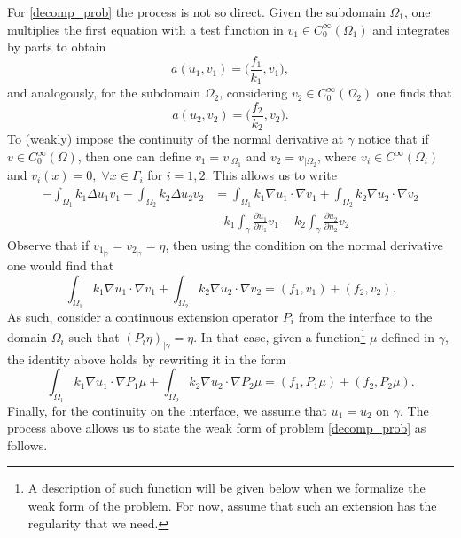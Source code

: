 For \eqref{decomp_prob} the process is not so direct. Given the subdomain \(\Omega_1\), one multiplies the first equation with a test function in \(v_1 \in C^\infty_0(\Omega_1)\) and integrates by parts to obtain
\[
a(u_1,v_1) = \Big(\frac{f_1}{k_1}, v_1\Big),
\]
and analogously, for the subdomain \(\Omega_2\), considering \(v_2 \in C^\infty_0(\Omega_2)\) one finds that
\[
a(u_2,v_2) = \Big(\frac{f_2}{k_2}, v_2\Big).
\]
To (weakly) impose the continuity of the normal derivative at \(\gamma\) notice that if \(v \in C^\infty_0(\Omega)\), then one can define \(v_1 = v_{|\Omega_1}\) and \(v_2 = v_{|\Omega_2}\), where \(v_i \in C^\infty(\Omega_i)\) and \(v_i(x)=0, \; \forall x \in \Gamma_i\) for \(i=1, 2\). This allows us to write
\begin{align*}
    -\int_{\Omega_1} k_1 \Delta u_1 v_1 -\int_{\Omega_2} k_2 \Delta u_2 v_2 &= \int_{\Omega_1} k_1\nabla u_1 \cdot \nabla v_1 + \int_{\Omega_2} k_2\nabla u_2 \cdot \nabla v_2\\
    &- k_1 \int_\gamma \frac{\partial u_1}{\partial n_1}v_1 - k_2 \int_\gamma \frac{\partial u_2}{\partial n_2}v_2
\end{align*}
Observe that if \(v_{1_{|\gamma}} = v_{2_{|\gamma}} = \eta\), then using the condition on the normal derivative one would find that
\[
\int_{\Omega_1} k_1\nabla u_1 \cdot \nabla v_1 + \int_{\Omega_2} k_2\nabla u_2 \cdot \nabla v_2 = (f_1, v_1) + (f_2, v_2).
\]
As such, consider a continuous extension operator \(P_i\) from the interface to the domain \(\Omega_i\) such that \((P_i \eta)_{|\gamma} = \eta\). In that case, given a function\footnote{A description of such function will be given below when we formalize the weak form of the problem. For now, assume that such an extension has the regularity that we need.} \(\mu\) defined in \(\gamma\), the identity above holds by rewriting it in the form
\[
\int_{\Omega_1} k_1\nabla u_1 \cdot \nabla P_1 \mu + \int_{\Omega_2} k_2\nabla u_2 \cdot \nabla P_2 \mu = (f_1, P_1 \mu) + (f_2, P_2 \mu).
\]
Finally, for the continuity on the interface, we assume that \(u_1 = u_2\) on \(\gamma\). The process above allows us to state the weak form of problem \eqref{decomp_prob} as follows.
